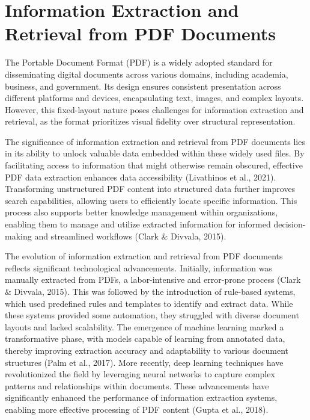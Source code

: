 \section{Information Extraction and Retrieval from PDF Documents}

The Portable Document Format (PDF) is a widely adopted standard for disseminating digital documents across various domains, including academia, business, and government. Its design ensures consistent presentation across different platforms and devices, encapsulating text, images, and complex layouts. However, this fixed-layout nature poses challenges for information extraction and retrieval, as the format prioritizes visual fidelity over structural representation.

The significance of information extraction and retrieval from PDF documents lies in its ability to unlock valuable data embedded within these widely used files. By facilitating access to information that might otherwise remain obscured, effective PDF data extraction enhances data accessibility (Livathinos et al., 2021). Transforming unstructured PDF content into structured data further improves search capabilities, allowing users to efficiently locate specific information. This process also supports better knowledge management within organizations, enabling them to manage and utilize extracted information for informed decision-making and streamlined workflows (Clark \& Divvala, 2015).

The evolution of information extraction and retrieval from PDF documents reflects significant technological advancements. Initially, information was manually extracted from PDFs, a labor-intensive and error-prone process (Clark \& Divvala, 2015). This was followed by the introduction of rule-based systems, which used predefined rules and templates to identify and extract data. While these systems provided some automation, they struggled with diverse document layouts and lacked scalability. The emergence of machine learning marked a transformative phase, with models capable of learning from annotated data, thereby improving extraction accuracy and adaptability to various document structures (Palm et al., 2017). More recently, deep learning techniques have revolutionized the field by leveraging neural networks to capture complex patterns and relationships within documents. These advancements have significantly enhanced the performance of information extraction systems, enabling more effective processing of PDF content (Gupta et al., 2018).

